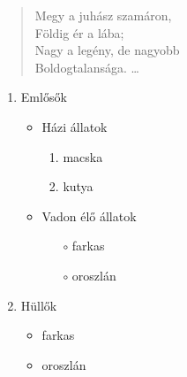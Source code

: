 \documentclass[a4paper]{article}
\begin{document}
\begin{verse}
Megy a juhász szamáron,\\
Földig ér a lába;\\
Nagy a legény, de nagyobb\\
Boldogtalansága.
\dots
\end{verse}

\begin{compactenum}
\renewcommand{\labelenumii}{\arabic{enumii}.}
\begin{enumerate}
\item Emlősők
	\begin{itemize}
	\item Házi állatok
		\begin{enumerate}
		\item macska
		\item kutya
		\end{enumerate}
	\item Vadon élő állatok
		\begin{itemize}
		\item[$\circ$] farkas
		\item[$\circ$] oroszlán
		\end{itemize}
	\end{itemize}
\item Hüllők
	\begin{itemize}
	\item farkas
	\item oroszlán
	\end{itemize}
\end{enumerate}
\end{compactenum}
\end{document}

